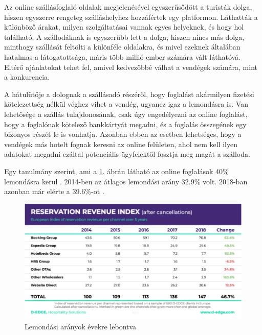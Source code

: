 

Az online szállásfoglaló oldalak megjelenésével egyszerűsődött a turisták dolga, hiszen egyszerre rengeteg szálláshelyhez hozzáfértek egy platformon. Láthatták a különböző árakat, milyen szolgáltatásai vannak egyes helyeknek, és hogy hol található. A szállodáknak is egyszerűbb lett a dolga, hiszen nincs más dolga, minthogy szállását feltölti a különféle oldalakra, és mivel ezeknek általában hatalmas a látogatottsága, máris több millió ember számára vált láthatóvá. Eltérő ajánlatokat tehet fel, amivel kedvezőbbé válhat a vendégek számára, mint a konkurencia.

A hátulütője a dolognak a szállásadó részéről, hogy foglalást akármilyen fizetési kötelezettség nélkül véghez vihet a vendég, ugyanez igaz a lemondásra is. Van lehetősége a szállás tulajdonosának, csak úgy engedélyezni az online foglalást, hogy a foglalónak kötelező bankkártyát megadni, és a foglalás összegének egy bizonyos részét le is vonhatja. Azonban ebben az esetben lehetséges, hogy a vendégek más hotelt fognak keresni az online felületen, ahol nem kell ilyen adatokat megadni ezáltal potenciális ügyfelektől fosztja meg magát a szálloda.

Egy tanulmány szerint, ami a \ref{fig:lemondasi}. ábrán látható az online foglalások 40\% lemondásra kerül \cite{online_lemondas}. 2014-ben az átlagos lemondási arány 32.9\% volt. 2018-ban azonban már elérte a 39.6\%-ot \cite{online_lemondas}.

\begin{figure}[h]
    \includegraphics[width=\textwidth]{images/2.fejezet/Online_foglalas_lemondas_szazalek.png}
    \caption{Lemondási arányok évekre lebontva}
    \label{fig:lemondasi}
\end{figure} 

